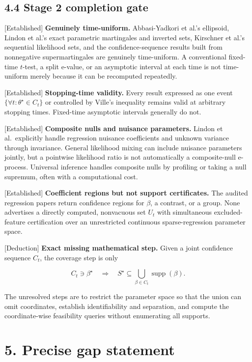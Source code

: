 \documentclass[
  english,
  11pt,
  a4paper,
]{article}
\begin{document}
\subsection{4.4 Stage 2 completion gate}\label{stage-2-completion-gate}

{[}Established{]} \textbf{Genuinely time-uniform.} Abbasi-Yadkori et
al.'s ellipsoid, Lindon et al.'s exact parametric martingales and
inverted sets, Kirschner et al.'s sequential likelihood sets, and the
confidence-sequence results built from nonnegative supermartingales are
genuinely time-uniform. A conventional fixed-time $t$-test, a split
e-value, or an asymptotic interval at each time is not time-uniform
merely because it can be recomputed repeatedly.

{[}Established{]} \textbf{Stopping-time validity.} Every result
expressed as one event $\{\forall t:\theta^\star\in C_t\}$ or
controlled by Ville's inequality remains valid at arbitrary stopping
times. Fixed-time asymptotic intervals generally do not.

{[}Established{]} \textbf{Composite nulls and nuisance parameters.}
Lindon et al.~explicitly handle regression nuisance coefficients and
unknown variance through invariance. General likelihood mixing can
include nuisance parameters jointly, but a pointwise likelihood ratio is
not automatically a composite-null e-process. Universal inference
handles composite nulls by profiling or taking a null supremum, often
with a computational cost.

{[}Established{]} \textbf{Coefficient regions but not support
certificates.} The audited regression papers return confidence regions
for $\beta$, a contrast, or a group. None advertises a directly
computed, nonvacuous set $U_t$ with simultaneous excluded-feature
certification over an unrestricted continuous sparse-regression
parameter space.

{[}Deduction{]} \textbf{Exact missing mathematical step.} Given a joint
confidence sequence $C_t$, the coverage step is only

$$
C_t\ni\beta^\star
\quad\Longrightarrow\quad
S^\star\subseteq\bigcup_{\beta\in C_t}\operatorname{supp}(\beta).
$$

The unresolved steps are to restrict the parameter space so that the
union can omit coordinates, establish identifiability and separation,
and compute the coordinate-wise feasibility queries without enumerating
all supports.

\section{5. Precise gap statement}\label{precise-gap-statement}
\end{document}
